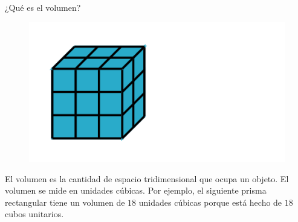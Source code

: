 \begin{card}[info]{¿Qué es el volumen?}
    \begin{figure}
        \centering
        \includegraphics[width=0.3\linewidth]{../images/34cbdad4cf3bf41a7fa9f13d7f0333783d20288a.svg}
    \end{figure}
    El volumen es la cantidad de espacio tridimensional que ocupa un objeto. El
    volumen se mide en unidades cúbicas.
    Por ejemplo, el siguiente prisma rectangular tiene un volumen de $18$
    unidades cúbicas porque está hecho de $18$ cubos unitarios.
\end{card}